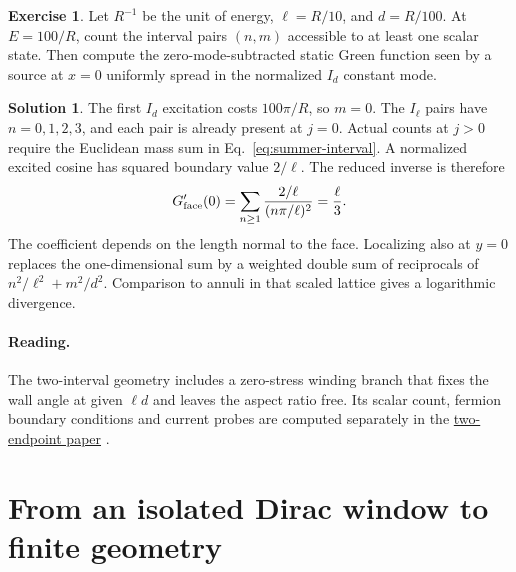 \documentclass[10pt]{article}
\theoremstyle{definition}
\newtheorem{exercise}{Exercise}
\newtheorem{solution}{Solution}
\begin{document}
\begin{exercise}
Let \(R^{-1}\) be the unit of energy, \(\ell=R/10\), and \(d=R/100\). At \(E=100/R\), count the interval pairs \((n,m)\) accessible to at least one scalar state. Then compute the zero-mode-subtracted static Green function seen by a source at \(x=0\) uniformly spread in the normalized \(I_d\) constant mode.
\end{exercise}

\begin{solution}
The first \(I_d\) excitation costs \(100\pi/R\), so \(m=0\). The \(I_\ell\) pairs have \(n=0,1,2,3\), and each pair is already present at \(j=0\). Actual counts at \(j>0\) require the Euclidean mass sum in Eq.~\eqref{eq:summer-interval}. A normalized excited cosine has squared boundary value \(2/\ell\). The reduced inverse is therefore
\begin{equation}
 G'_{\rm face}(0)=\sum_{n\ge1}\frac{2/\ell}{(n\pi/\ell)^2}
                  =\frac{\ell}{3}.
 \label{eq:summer-face}
\end{equation}
The coefficient depends on the length normal to the face. Localizing also at \(y=0\) replaces the one-dimensional sum by a weighted double sum of reciprocals of \(n^2/\ell^2+m^2/d^2\). Comparison to annuli in that scaled lattice gives a logarithmic divergence.
\end{solution}

\paragraph{Reading.} The two-interval geometry includes a zero-stress winding branch that fixes the wall angle at given \(\ell d\) and leaves the aspect ratio free. Its scalar count, fermion boundary conditions and current probes are computed separately in the \href{https://github.com/arivero/conneskk/blob/master/paper/two_endpoint_limits.tex}{two-endpoint paper} \cite{TwoEndpoint2026}.

\section{From an isolated Dirac window to finite geometry}
\end{document}
